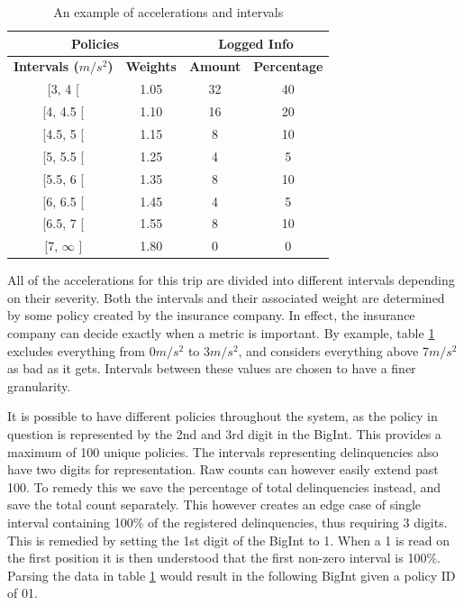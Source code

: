 \begin{table}[h]
\centering
\begin{tabular}{cc | cc}
\multicolumn{2}{c}{\textbf{Policies}} & \multicolumn{2}{c}{\textbf{Logged Info}} \\\hline
\textbf{Intervals ($m/s^{2}$)}     & \textbf{Weights}     & \textbf{Amount}     & \textbf{Percentage}     \\\hline
{[}3, 4 {[}              & 1.05              &   32            & 40              \\
{[}4, 4.5 {[}            & 1.10              &   16            & 20              \\
{[}4.5, 5 {[}            & 1.15              &   8             & 10              \\
{[}5, 5.5 {[}            & 1.25              &   4             & 5              \\
{[}5.5, 6 {[}            & 1.35              &   8             & 10              \\
{[}6, 6.5 {[}            & 1.45              &   4             & 5              \\
{[}6.5, 7 {[}            & 1.55              &   8             & 10              \\
{[}7, $\infty$ {]}       & 1.80              &   0             & 0              \\\hline
\end{tabular}
\caption{An example of accelerations and intervals}
\label{tab:intervalexample}
\end{table}

All of the accelerations for this trip are divided into different intervals depending on their severity. Both the intervals and their associated weight are determined by some policy created by the insurance company. In effect, the insurance company can decide exactly when a metric is important. By example, table \ref{tab:intervalexample} excludes everything from 0$m/s^2$ to 3$m/s^2$, and considers everything above 7$m/s^2$ as bad as it gets. Intervals between these values are chosen to have a finer granularity.

It is possible to have different policies throughout the system, as the policy in question is represented by the 2nd and 3rd digit in the BigInt. This provides a maximum of 100 unique policies. The intervals representing delinquencies also have two digits for representation. Raw counts can however easily extend past 100. To remedy this we save the percentage of total delinquencies instead, and save the total count separately. This however creates an edge case of single interval containing 100\% of the registered delinquencies, thus requiring 3 digits. This is remedied by setting the 1st digit of the BigInt to 1. When a 1 is read on the first position it is then understood that the first non-zero interval is 100\%. Parsing the data in table \ref{tab:intervalexample} would result in the following BigInt given a policy ID of 01.

